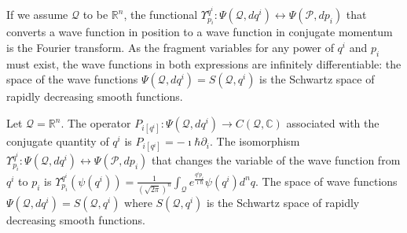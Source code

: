 \documentclass[smallextended]{svjour3}
\numberwithin{equation}{section}
\begin{document}
If we assume $\mathcal{Q}$ to be $\mathbb{R}^n$, the functional $\Upsilon^{q^i}_{p_i} : \Psi(\mathcal{Q}, dq^i) \leftrightarrow \Psi(\mathcal{P}, dp_i)$ that converts a wave function in position to a wave function in conjugate momentum is the Fourier transform. As the fragment variables for any power of $q^i$ and $p_i$ must exist, the wave functions in both expressions are infinitely differentiable: the space of the wave functions $\Psi(\mathcal{Q}, dq^i) = S(\mathcal{Q}, q^i)$ is the Schwartz space of rapidly decreasing smooth functions.

\begin{prop}\label{prop:momentum_operator}
	Let $\mathcal{Q}=\mathbb{R}^n$. The operator $P_{i [q^i]} : \Psi(\mathcal{Q}, dq^i) \rightarrow C(\mathcal{Q}, \mathbb{C})$ associated with the conjugate quantity of $q^i$ is $P_{i [q^i]} = - \imath \hbar \partial_{i}$. The isomorphism $\Upsilon^{q^i}_{p_i} : \Psi(\mathcal{Q}, dq^i) \leftrightarrow \Psi(\mathcal{P}, dp_i)$ that changes the variable of the wave function from $q^i$ to $p_i$ is $\Upsilon^{q^i}_{p_i} (\psi(q^i)) = \frac{1}{(\sqrt{2\pi})^n} \int_{\mathcal{Q}} e^{\frac{q^i p_i }{\imath \hbar}} \psi(q^i) d^n q $. The space of wave functions $\Psi(\mathcal{Q}, dq^i) = S(\mathcal{Q}, q^i)$ where $S(\mathcal{Q}, q^i)$ is the Schwartz space of rapidly decreasing smooth functions. 
\end{prop}
\end{document}
